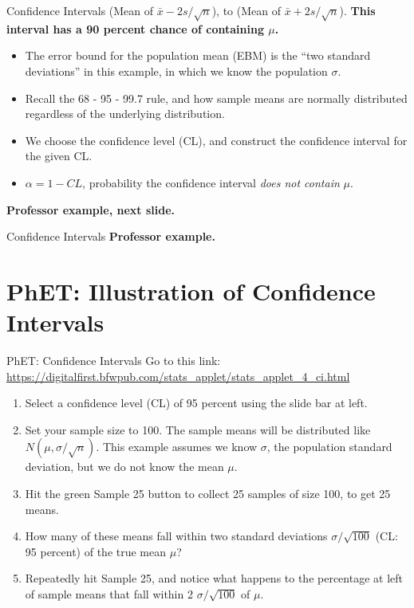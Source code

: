 \documentclass{beamer}
\begin{document}
\begin{frame}{Confidence Intervals}
\small
(Mean of $\bar{x} - 2s/\sqrt{n}$), to (Mean of $\bar{x} + 2s/\sqrt{n}$).  \textbf{\alert{This interval has a 90 percent chance of containing $\mu$.}} \\ 
\begin{itemize}
\item The error bound for the population mean (EBM) is the ``two standard deviations'' in this example, in which we know the population $\sigma$.
\item Recall the 68 - 95 - 99.7 rule, and how sample means are normally distributed regardless of the underlying distribution.
\item We choose the confidence level (CL), and construct the confidence interval for the given CL.
\item $\alpha = 1 -CL$, probability the confidence interval \textit{does not contain} $\mu$.
\end{itemize}
\textbf{Professor example, next slide.}
\end{frame}

\begin{frame}{Confidence Intervals}
\textbf{Professor example.} \\ \vspace{7cm}
\end{frame}

\section{PhET: Illustration of Confidence Intervals}

\begin{frame}{PhET: Confidence Intervals}
\small
Go to this link: \url{https://digitalfirst.bfwpub.com/stats_applet/stats_applet_4_ci.html}
\begin{enumerate}
\item Select a confidence level (CL) of 95 percent using the slide bar at left.
\item Set your sample size to 100.  The sample means will be distributed like $N(\mu,\sigma/\sqrt{n})$.  \alert{This example assumes we know $\sigma$, the population standard deviation, but we do not know the mean $\mu$.}
\item Hit the green Sample 25 button to collect 25 samples of size 100, to get 25 means.
\item How many of these means fall within two standard deviations $\sigma/\sqrt{100}$ (CL: 95 percent) of the true mean $\mu$?
\item Repeatedly hit Sample 25, and notice what happens to the percentage at left of sample means that fall within 2 $\sigma/\sqrt{100}$ of $\mu$.
\end{enumerate}
\end{frame}
\end{document}
